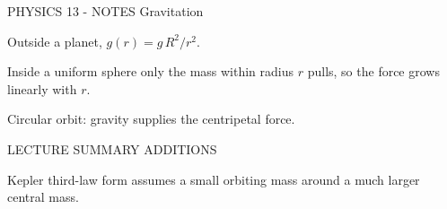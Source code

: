 PHYSICS 13 - NOTES
Gravitation

Outside a planet, \(g(r) = g\,R^2/r^2\).

Inside a uniform sphere only the mass within radius \(r\) pulls, so the force grows linearly with \(r\).

Circular orbit: gravity supplies the centripetal force.

LECTURE SUMMARY ADDITIONS

Kepler third-law form assumes a small orbiting mass around a much larger central mass.

